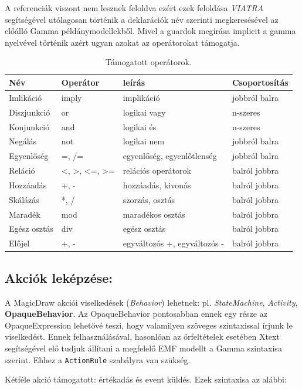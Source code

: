A referenciák viszont nem lesznek feloldva ezért ezek feloldása \emph{VIATRA} segítségével utólagosan történik a deklarációk név szerinti megkeresésével az előálló Gamma példánymodellekből. Mivel a guardok megírása implicit a gamma nyelvével történik azért ugyan azokat az operátorokat támogatja.

\begin{table}[!h]
	\footnotesize
	\centering
	\begin{tabular}{ l l l l }
		Név & Operátor& leírás & Csoportosítás \\ \hline
		 Imlikáció & imply & implikáció & jobbról balra \\
		 Diszjunkció & or & logikai vagy & n-szeres\\
		 Konjunkció & and & logikai és & n-szeres \\
		 Negálás & not & logikai nem & jobbról balra \\
		 Egyenlőség & =, /= & egyenlőség, egyenlőtlenség & jobbról balra \\
		 Reláció & <, >, <=, >= & relációs operátorok & balról jobbra \\  
		 Hozzáadás & +, - & hozzáadás, kivonás & balról jobbra \\
		 Skálázás & *, / & szorzás, osztás & balról jobbra \\
		 Maradék & mod & maradékos osztás & balról jobbra \\
		 Egész osztás & div & egész osztás & balról jobbra \\
		 Előjel & +, - & egyváltozós +, egyváltozós - & balról jobbra
	\end{tabular}
	\caption{Támogatott operátorok.}
	\label{table:operators}
\end{table}


\subsection{Akciók leképzése:}
A MagicDraw akciói viselkedések (\emph{Behavior}) lehetnek: pl. \emph{StateMachine}, \emph{Activity}, \textbf{OpaqueBehavior}. Az OpaqueBehavior pontosabban ennek egy része az OpaqueExpression lehetővé teszi, hogy valamilyen szöveges szintaxissal írjunk le viselkedést. Ennek felhasználásával, hasonlóan az őrfeltételek esetében Xtext segítségével elő tudjuk állítani a megfelelő EMF modellt a Gamma szintaxisa szerint. Ehhez a \verb+ActionRule+ szabályra van szükség.

Kétféle akció támogatott: értékadás és event küldés. Ezek szintaxisa az alábbi:

